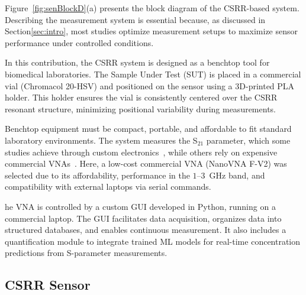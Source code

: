 \documentclass[journal,twoside,web]{ieeecolor}
\begin{document}
Figure~\ref{fig:senBlockD}(a) presents the block diagram of the CSRR-based system. Describing the measurement system is essential because, as discussed in Section\ref{sec:intro}, most studies optimize measurement setups to maximize sensor performance under controlled conditions.

In this contribution, the CSRR system is designed as a benchtop tool for biomedical laboratories. The Sample Under Test (SUT) is placed in a commercial vial (Chromacol 20-HSV) and positioned on the sensor using a 3D-printed PLA holder. This holder ensures the vial is consistently centered over the CSRR resonant structure, minimizing positional variability during measurements. 

Benchtop equipment must be compact, portable, and affordable to fit standard laboratory environments. The system measures the S$_{21}$ parameter, which some studies achieve through custom electronics~\cite{Omer2020, Omer2021}, while others rely on expensive commercial VNAs~\cite{Patel2022, Jiang2023, Liu2024}. Here, a low-cost commercial VNA (NanoVNA F-V2) was selected due to its affordability, performance in the $1$–$3$~GHz band, and compatibility with external laptops via serial commands.

he VNA is controlled by a custom GUI developed in Python, running on a commercial laptop. The GUI facilitates data acquisition, organizes data into structured databases, and enables continuous measurement. It also includes a quantification module to integrate trained ML models for real-time concentration predictions from S-parameter measurements. 
\subsection{CSRR Sensor}
\label{ssec:csrrSensor}
\end{document}

